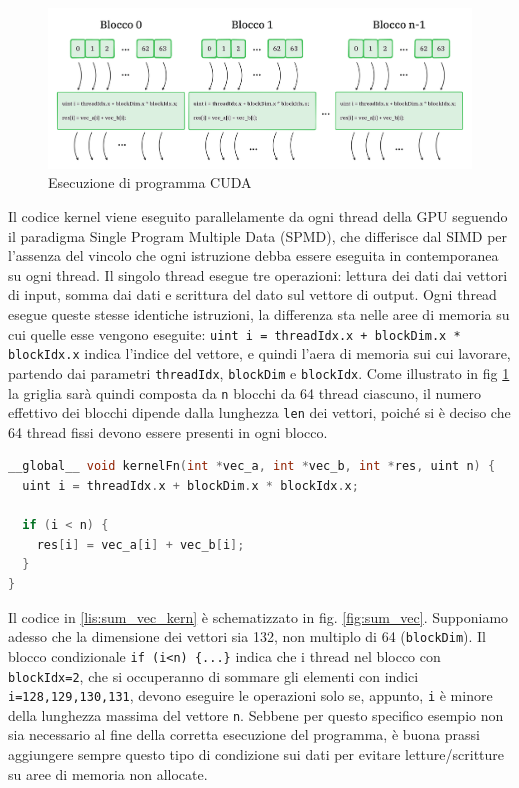 \begin{figure}[ht]
    \centering
    \includegraphics[width=.9\linewidth]{images/chapter2/grid.png}
    \caption{Esecuzione di programma CUDA}
    \label{fig:grid}
\end{figure}

Il codice kernel viene eseguito parallelamente da ogni thread della GPU seguendo il paradigma Single Program Multiple Data (\gls{SPMD}), che differisce dal SIMD per l'assenza del vincolo che ogni istruzione debba essere eseguita in contemporanea su ogni thread. Il singolo thread esegue tre operazioni: lettura dei dati dai vettori di input, somma dai dati e scrittura del dato sul vettore di output. Ogni thread esegue queste stesse identiche istruzioni, la differenza sta nelle aree di memoria su cui quelle esse vengono eseguite: \verb|uint i = threadIdx.x + blockDim.x * blockIdx.x| indica l'indice del vettore, e quindi l'aera di memoria sui cui lavorare, partendo dai parametri \verb|threadIdx|, \verb|blockDim| e \verb|blockIdx|. Come illustrato in fig \ref{fig:grid} la griglia sarà quindi composta da \verb|n| blocchi da 64 thread ciascuno, il numero effettivo dei blocchi dipende dalla lunghezza \verb|len| dei vettori, poiché si è deciso che 64 thread fissi devono essere presenti in ogni blocco.

\vspace{5mm}
\begin{lstlisting}[language=C++, caption=Kernel CUDA di somma di vettori, label=lis:sum_vec_kern]
__global__ void kernelFn(int *vec_a, int *vec_b, int *res, uint n) {
  uint i = threadIdx.x + blockDim.x * blockIdx.x;

  if (i < n) {
    res[i] = vec_a[i] + vec_b[i];
  }
}\end{lstlisting}
\vspace{5mm}

Il codice in \ref{lis:sum_vec_kern} è schematizzato in fig. \ref{fig:sum_vec}. Supponiamo adesso che la dimensione dei vettori sia 132, non multiplo di 64 (\verb|blockDim|). Il blocco condizionale \verb|if (i<n) {...}| indica che i thread nel blocco con \verb|blockIdx=2|, che si occuperanno di sommare gli elementi con indici \verb|i=128,129,130,131|, devono eseguire le operazioni solo se, appunto, \verb|i| è minore della lunghezza massima del vettore \verb|n|. Sebbene per questo specifico esempio non sia necessario al fine della corretta esecuzione del programma, è buona prassi aggiungere sempre questo tipo di condizione sui dati per evitare letture/scritture su aree di memoria non allocate.

